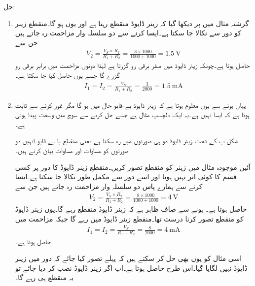 حل: 
\begin{enumerate}
\item
گزشتہ مثال میں   پر دیکھا گیا کہ زینر ڈایوڈ منقطع رہتا ہے اور یوں   ہو گا۔منقطع زینر کو دور سے نکالا جا سکتا ہے۔ایسا کرنے سے دو سلسلہ وار مزاحمت رہ جاتے ہیں جن سے
\begin{align*}
V_2=\frac{V_S \times R_2}{R_1+R_2}=\frac{3 \times 1000}{1000+1000}=\SI{1.5}{\volt}
\end{align*}
حاصل ہوتا ہے۔چونکہ زینر ڈایوڈ میں صفر برقی رو گزرتا ہے لہٰذا دونوں مزاحمت میں برابر برقی رو گزرے گا جسے یوں حاصل کیا جا سکتا ہے۔
\begin{align*}
I_1=I_2=\frac{V_S}{R_1+R_2}=\frac{3}{2000}=\SI{1.5}{\milli \ampere}
\end{align*}
\item
یہاں   ہونے سے یوں معلوم ہوتا ہے کہ زینر ڈایوڈ بے-قابو حال میں ہو گا مگر غور کرنے سے ثابت ہوتا ہے کہ ایسا نہیں ہے۔یہ ایک دلچسپ مثال ہے جسے حل کرنے سے سوچ میں وسعت پیدا ہوتی ہے۔

شکل  ب کے تحت زینر ڈایوڈ دو ہی صورتوں میں رہ سکتا ہے یعنی منقطع یا بے قابو۔انہیں دو صورتوں کو مساوات   اور مساوات   بیان کرتے ہیں۔

آئیں موجودہ مثال میں زینر کو منقطع تصور کریں۔منقطع زینر ڈایوڈ کا دور پر کسی قسم کا کوئی اثر نہیں ہوتا اور اسے دور سے مکمل طور نکالا جا سکتا ہے۔ایسا کرنے سے ہمارے پاس دو سلسلہ وار مزاحمت رہ جاتے ہیں جن سے
\begin{align*}
V_2=\frac{V_S \times R_2}{R_1+R_2}=\frac{8 \times 1000}{1000+1000}=\SI{4}{\volt}
\end{align*}
حاصل ہوتا ہے۔   ہونے سے صاف ظاہر ہے کہ زینر ڈایوڈ منقطع رہے گا۔یوں زینر ڈایوڈ کو منقطع تصور کرنا درست تھا۔منقطع زینر ڈایوڈ میں  رہے گا جبکہ مزاحمت میں
\begin{align*}
I_1=I_2=\frac{V_S}{R_1+R_2}=\frac{8}{2000}=\SI{4}{\milli \ampere}
\end{align*}
حاصل ہوتا ہے۔

اسی مثال کو یوں بھی حل کر سکتے ہیں کہ پہلے تصور کیا جائے کہ دور میں زینر ڈایوڈ نہیں لگایا گیا۔اس طرح  حاصل ہوتا ہے۔اب اگر زینر ڈایوڈ نصب کر دیا جائے تو یہ منقطع ہی رہے گا۔


\end{enumerate}
